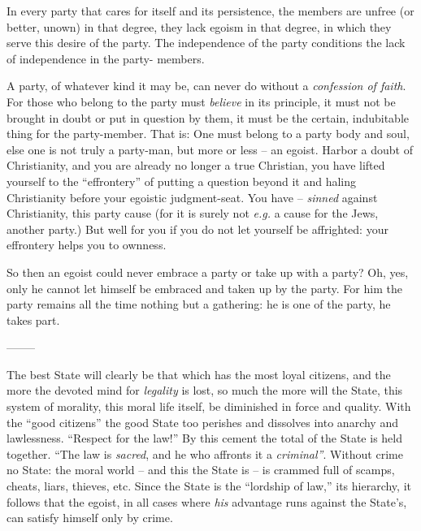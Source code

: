 In every party that cares for itself and its persistence, the members are 
unfree (or better, unown) in that degree, they lack egoism in that degree, in 
which they serve this desire of the party. The independence of the party 
conditions the lack of independence in the party- members.

A party, of whatever kind it may be, can never do without a \textit{confession 
of faith}. For those who belong to the party must \textit{believe} in its 
principle, it must not be brought in doubt or put in question by them, it must 
be the certain, indubitable thing for the party-member. That is: One must 
belong to a party body and soul, else one is not truly a party-man, but more 
or less -- an egoist. Harbor a doubt of Christianity, and you are already no 
longer a true Christian, you have lifted yourself to the ``effrontery'' of 
putting a question beyond it and haling Christianity before your egoistic 
judgment-seat. You have -- \textit{sinned} against Christianity, this party 
cause (for it is surely not \textit{e.g.} a cause for the Jews, another 
party.) But well for you if you do not let yourself be affrighted: your 
effrontery helps you to ownness.

So then an egoist could never embrace a party or take up with a party? Oh, 
yes, only he cannot let himself be embraced and taken up by the party. For him 
the party remains all the time nothing but a gathering: he is one of the 
party, he takes part.

\begin{center}
--------\end{center}


The best State will clearly be that which has the most loyal citizens, and the 
more the devoted mind for \textit{legality} is lost, so much the more will the 
State, this system of morality, this moral life itself, be diminished in force 
and quality. With the ``good citizens'' the good State too perishes and 
dissolves into anarchy and lawlessness. ``Respect for the law!'' By this 
cement the total of the State is held together. ``The law is \textit{sacred}, 
and he who affronts it a \textit{criminal''}. Without crime no State: the 
moral world -- and this the State is -- is crammed full of scamps, cheats, 
liars, thieves, etc. Since the State is the ``lordship of law,'' its 
hierarchy, it follows that the egoist, in all cases where \textit{his} 
advantage runs against the State's, can satisfy himself only by crime.

